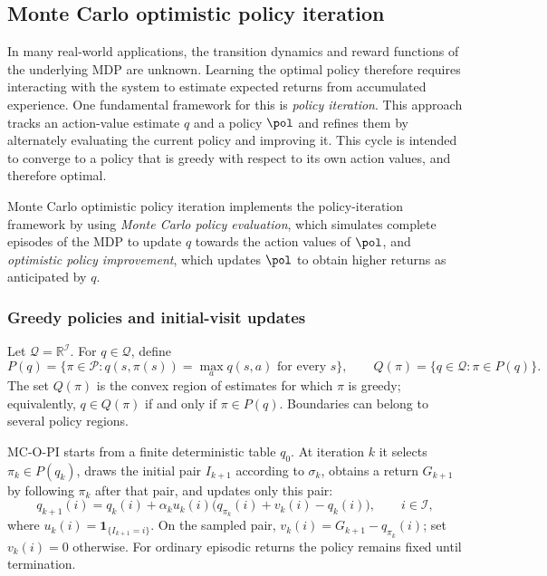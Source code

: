 \subsection{Monte Carlo optimistic policy iteration}

In many real-world applications, the transition dynamics and reward functions of the underlying MDP are unknown. Learning the optimal policy therefore requires interacting with the system to estimate expected returns from accumulated experience.
One fundamental framework for this is \textit{policy iteration}.
This approach tracks an action-value estimate $q$ and a policy $\pol$ and refines them by alternately evaluating the current policy and improving it.
This cycle is intended to converge to a policy that is greedy with respect to its own action values, and therefore optimal.


Monte Carlo optimistic policy iteration implements the policy-iteration framework by using 
\textit{Monte Carlo policy evaluation}, which simulates complete episodes of the MDP to update $q$ towards the action values of $\pol$,
and \textit{optimistic policy improvement}, which updates $\pol$ to obtain higher returns as anticipated by $q$.


\subsubsection{Greedy policies and initial-visit updates}
Let $\mathcal Q=\mathbb R^{\mathcal I}$. For $q\in\mathcal Q$, define
\[
P(q)=\{\pi\in\mathcal P:q(s,\pi(s))=\max_a q(s,a)\text{ for every }s\},
\qquad Q(\pi)=\{q\in\mathcal Q:\pi\in P(q)\}.
\]
The set $Q(\pi)$ is the convex region of estimates for which $\pi$ is greedy; equivalently, $q\in Q(\pi)$ if and only if $\pi\in P(q)$. Boundaries can belong to several policy regions.

MC-O-PI starts from a finite deterministic table $q_0$. At iteration $k$ it selects $\pi_k\in P(q_k)$, draws the initial pair $I_{k+1}$ according to $\sigma_k$, obtains a return $G_{k+1}$ by following $\pi_k$ after that pair, and updates only this pair:
\begin{equation}\label{eq: update q with chi}
q_{k+1}(i)=q_k(i)+\alpha_k u_k(i)\bigl(q_{\pi_k}(i)+v_k(i)-q_k(i)\bigr),\qquad i\in\mathcal I,
\end{equation}
where $u_k(i)=\mathbf1_{\{I_{k+1}=i\}}$. On the sampled pair, $v_k(i)=G_{k+1}-q_{\pi_k}(i)$; set $v_k(i)=0$ otherwise. For ordinary episodic returns the policy remains fixed until termination.

